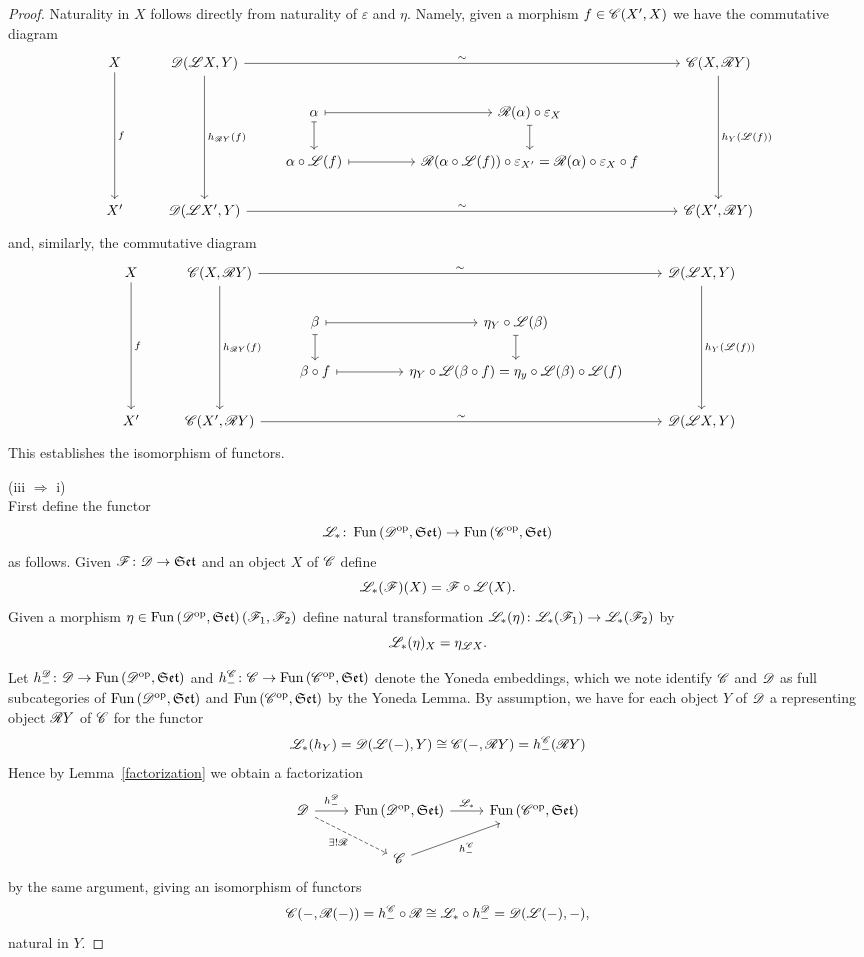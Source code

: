 \documentclass[10pt]{amsart}
\begin{document}
\begin{prop}
\begin{proof}
    Naturality in $X$ follows directly from naturality of $\varepsilon$ and $\eta$.
    Namely, given a morphism $f \in \mathscr{C}(X^\prime, X)$ we have the commutative diagram
    $$\begin{tikzcd}
      X\arrow{ddd}{f} & \D(\LA X, Y) \arrow{rrrr}{\sim}\arrow{ddd}{h_{\RA Y}(f)}& & & & \C(X, \RA Y)\arrow{ddd}{h_{Y}(\LA(f))}\\
      & & \alpha \arrow[mapsto]{rr}\arrow[mapsto]{d}& & \RA(\alpha) \circ \varepsilon_X\arrow[mapsto]{d}\\
      & & \alpha \circ \LA(f) \arrow[mapsto]{rr} & & \RA(\alpha \circ \LA(f)) \circ \varepsilon_{X^\prime} = \RA(\alpha) \circ \varepsilon_X \circ f\\
      X^\prime & \D(\LA X^\prime, Y) \arrow{rrrr}{\sim} & & & & \C(X^\prime, \RA Y)
    \end{tikzcd}$$
    and, similarly, the commutative diagram
    $$\begin{tikzcd}
      X\arrow{ddd}{f} & \C(X, \RA Y) \arrow{rrrr}{\sim}\arrow{ddd}{h_{\RA Y}(f)}& & & & \D(\LA X, Y)\arrow{ddd}{h_{Y}(\LA(f))}\\
      & & \beta \arrow[mapsto]{rr}\arrow[mapsto]{d}& & \eta_Y \circ \LA(\beta)\arrow[mapsto]{d}\\
      & & \beta \circ f \arrow[mapsto]{rr} & & \eta_Y \circ \LA(\beta \circ f) = \eta_y \circ \LA(\beta) \circ \LA(f)\\
      X^\prime & \C(X^\prime, \RA Y) \arrow{rrrr}{\sim} & & & & \D(\LA X, Y)
    \end{tikzcd}$$
    This establishes the isomorphism of functors.
    
    
    (iii $\Rightarrow$ i)\\
    First define the functor
    $$\mathscr{L}_\ast \colon \operatorname{Fun}\left(\mathscr{D}^\text{op}, \mathfrak{Set}\right) \to \operatorname{Fun}\left(\mathscr{C}^\text{op}, \mathfrak{Set}\right)$$
    as follows.
    Given $\mathscr{F} \colon \mathscr{D} \to \mathfrak{Set}$ and an object $X$ of $\mathscr{C}$ define
    $$\mathscr{L}_\ast(\mathscr{F})(X) = \mathscr{F} \circ \mathscr{L}(X).$$
    Given a morphism $\eta \in \operatorname{Fun}\left(\mathscr{D}^\text{op}, \mathfrak{Set}\right)(\mathscr{F}_1, \mathscr{F}_2)$ define natural transformation
    $\mathscr{L}_\ast(\eta) \colon \mathscr{L}_\ast(\mathscr{F}_1) \to \mathscr{L}_\ast(\mathscr{F}_2)$ by
    $$\mathscr{L}_\ast(\eta)_X = \eta_{\mathscr{L} X}.$$
    
    Let $h_-^{\mathscr{D}} \colon \mathscr{D} \to \operatorname{Fun}\left(\mathscr{D}^\text{op}, \mathfrak{Set}\right)$ and $h_-^{\mathscr{C}} \colon \mathscr{C} \to \operatorname{Fun}\left(\mathscr{C}^\text{op}, \mathfrak{Set}\right)$ denote the Yoneda embeddings, which we note identify $\mathscr{C}$ and $\mathscr{D}$ as full subcategories of $\operatorname{Fun}\left(\mathscr{D}^\text{op}, \mathfrak{Set}\right)$ and $\operatorname{Fun}\left(\mathscr{C}^\text{op}, \mathfrak{Set}\right)$ by the Yoneda Lemma.
    By assumption, we have for each object $Y$ of $\mathscr{D}$ a representing object $\mathscr{R} Y$ of $\mathscr{C}$ for the functor 
    $$\mathscr{L}_\ast(h_Y) = \mathscr{D}(\mathscr{L}( - ), Y) \cong \mathscr{C}(-, \mathscr{R} Y) = h_-^{\mathscr{C}}(\mathscr{R} Y)$$
    Hence by Lemma~\ref{factorization} we obtain a factorization
    $$\begin{tikzcd}
      \D \arrow{r}{h_-^{\D}}\arrow[dashed,swap]{rd}{\exists ! \RA} & \Fun{\D^\text{op}}{\Sets} \arrow{r}{\LA_\ast} & \Fun{\C^\text{op}}{\Sets}\\
      & \C \arrow[swap]{ur}{h_-^{\C}}
    \end{tikzcd}$$
    by the same argument, giving an isomorphism of functors
    $$\mathscr{C}(-, \mathscr{R}( - )) = h_-^{\mathscr{C}} \circ \mathscr{R} \cong \mathscr{L}_\ast \circ h_-^{\mathscr{D}} = \mathscr{D}(\mathscr{L}( - ), -),$$
    natural in $Y$.
    

\end{proof}
\end{prop}
\end{document}
